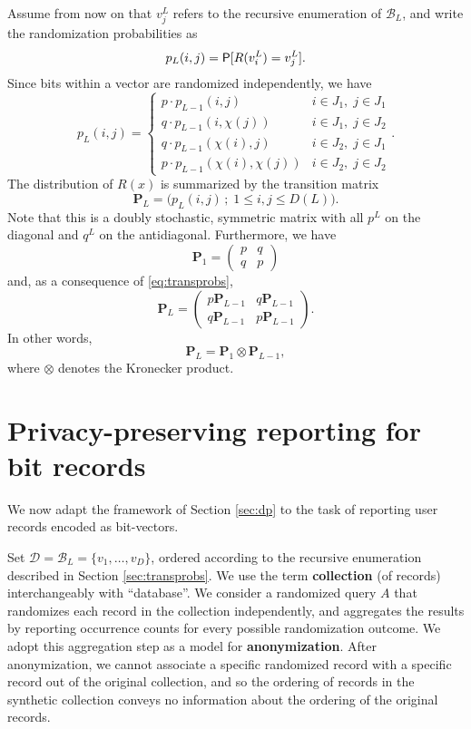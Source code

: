 \documentclass[11pt,draft]{article}
\newcommand{\Dsp}{\mathcal{D}}
\newcommand{\Bsp}{\mathcal{B}}
\newcommand{\Pm}{\mathbf{P}}
\begin{document}
Assume from now on that $v_j^L$ refers to the recursive enumeration of
$\Bsp_L$, and write the randomization probabilities as
\[ p_L(i,j) = \P[R(v_i^L) = v_j^L]. \]
Since bits within a vector are randomized independently, we have
\begin{equation} \label{eq:transprobs}
p_L(i,j) = \begin{cases}
p\cdot p_{L-1}(i, j) &
    i \in J_1,\; j \in J_1 \\
q\cdot p_{L-1}(i,\chi(j)) &
    i \in J_1,\; j \in J_2 \\
q\cdot p_{L-1}(\chi(i),j) &
    i \in J_2,\; j \in J_1 \\
p\cdot p_{L-1}(\chi(i), \chi(j)) &
    i \in J_2,\; j \in J_2
 \end{cases}.
\end{equation}
The distribution of $R(x)$ is summarized by the transition matrix
\[ \Pm_L = \Big(p_L(i,j)\,;\; 1 \leq i,j \leq D(L)\Big). \]
Note that this is a doubly stochastic, symmetric matrix with all $p^L$ on
the diagonal and $q^L$ on the antidiagonal.
Furthermore, we have
\[ \Pm_1 = \begin{pmatrix}p & q \\ q & p \end{pmatrix} \]
and, as a consequence of \eqref{eq:transprobs},
\[ \Pm_L = \begin{pmatrix} p\Pm_{L-1} & q\Pm_{L-1} \\
q\Pm_{L-1} & p\Pm_{L-1} \end{pmatrix}. \]
In other words,
\[ \Pm_L = \Pm_1 \otimes \Pm_{L-1}, \]
where $\otimes$ denotes the Kronecker product.


\section{Privacy-preserving reporting for bit records}

We now adapt the framework of Section \ref{sec:dp} to the task of reporting
user records encoded as bit-vectors.

Set $\Dsp = \Bsp_L = \{v_1,\dots, v_D\}$, ordered according to the recursive
enumeration described in Section \ref{sec:transprobs}.
We use the term \textbf{collection} (of records) interchangeably with
``database''.
We consider a randomized query $A$ that randomizes each record in the
collection independently, and aggregates the results by reporting occurrence
counts for every possible randomization outcome.
We adopt this aggregation step as a model for \textbf{anonymization}.
After anonymization, we cannot associate a specific randomized record with
a specific record out of the original collection, and so the ordering of
records in the synthetic collection conveys no information about the ordering
of the original records.
\end{document}
